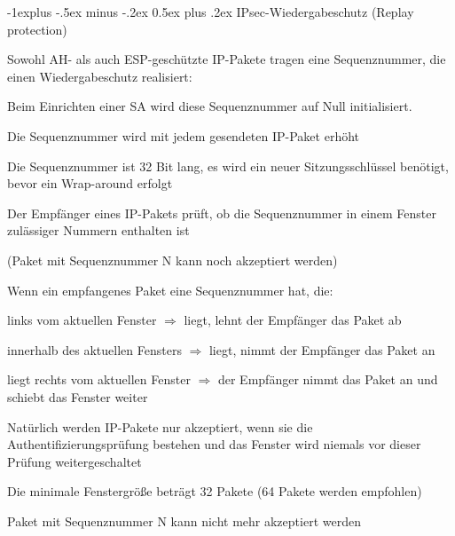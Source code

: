 \documentclass[a4paper]{article}
\makeatletter
\renewcommand{\subsection}{\@startsection{subsection}{2}{0mm}%
 {-1explus -.5ex minus -.2ex}%
 {0.5ex plus .2ex}%
 {\normalfont\normalsize\bfseries}}
\makeatother
\begin{document}
\begin{multicols}{3}
      \subsection{IPsec-Wiedergabeschutz (Replay protection)}
      \begin{itemize*}
            \item Sowohl AH- als auch ESP-geschützte IP-Pakete tragen eine
            Sequenznummer, die einen Wiedergabeschutz realisiert:
            \begin{itemize*}
                  \item Beim Einrichten einer SA wird diese Sequenznummer auf Null initialisiert.
                  \item Die Sequenznummer wird mit jedem gesendeten IP-Paket erhöht
                  \item Die Sequenznummer ist 32 Bit lang, es wird ein neuer Sitzungsschlüssel benötigt, bevor ein Wrap-around erfolgt
                  \item Der Empfänger eines IP-Pakets prüft, ob die Sequenznummer in einem Fenster zulässiger Nummern enthalten ist
                  \begin{itemize*}
                        \item (Paket mit Sequenznummer N kann noch akzeptiert werden)
                  \end{itemize*}
            \end{itemize*}
            \item Wenn ein empfangenes Paket eine Sequenznummer hat, die:
            \begin{itemize*}
                  \item links vom aktuellen Fenster $\Rightarrow$ liegt, lehnt der Empfänger das Paket ab
                  \item innerhalb des aktuellen Fensters $\Rightarrow$ liegt, nimmt der Empfänger das Paket an
                  \item liegt rechts vom aktuellen Fenster $\Rightarrow$ der Empfänger nimmt das Paket an und schiebt das Fenster weiter
                  \item Natürlich werden IP-Pakete nur akzeptiert, wenn sie die Authentifizierungsprüfung bestehen und das Fenster wird niemals vor dieser Prüfung weitergeschaltet
            \end{itemize*}
            \item Die minimale Fenstergröße beträgt 32 Pakete (64 Pakete werden empfohlen)
            \begin{itemize*}
                  \item Paket mit Sequenznummer N kann nicht mehr akzeptiert werden
            \end{itemize*}
      \end{itemize*}


\end{multicols}
\end{document}
